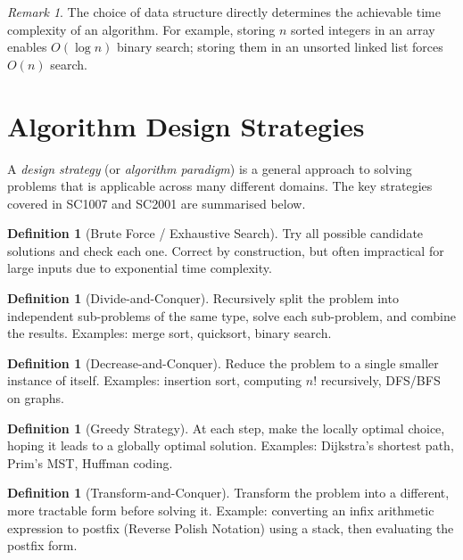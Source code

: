 \documentclass[11pt, a4paper, notitlepage]{report}
\theoremstyle{definition}
\newtheorem{definition}[theorem]{Definition}
\theoremstyle{remark}
\newtheorem{remark}[theorem]{Remark}
\theoremstyle{definition}
\begin{document}
\begin{remark}
The choice of data structure directly determines the achievable time complexity of an
algorithm.  For example, storing $n$ sorted integers in an array enables $O(\log n)$ binary
search; storing them in an unsorted linked list forces $O(n)$ search.
\end{remark}

\section{Algorithm Design Strategies}
\label{sec:design-strategies}

A \emph{design strategy} (or \emph{algorithm paradigm}) is a general approach to solving
problems that is applicable across many different domains.  The key strategies covered in
SC1007 and SC2001 are summarised below.

\begin{definition}[Brute Force / Exhaustive Search]
Try all possible candidate solutions and check each one.  Correct by construction, but often
impractical for large inputs due to exponential time complexity.
\end{definition}

\begin{definition}[Divide-and-Conquer]
Recursively split the problem into independent sub-problems of the same type, solve each
sub-problem, and combine the results.  Examples: merge sort, quicksort, binary search.
\end{definition}

\begin{definition}[Decrease-and-Conquer]
Reduce the problem to a single smaller instance of itself.  Examples: insertion sort,
computing $n!$ recursively, DFS/BFS on graphs.
\end{definition}

\begin{definition}[Greedy Strategy]
At each step, make the locally optimal choice, hoping it leads to a globally optimal solution.
Examples: Dijkstra's shortest path, Prim's MST, Huffman coding.
\end{definition}

\begin{definition}[Transform-and-Conquer]
Transform the problem into a different, more tractable form before solving it.  Example:
converting an infix arithmetic expression to postfix (Reverse Polish Notation) using a stack,
then evaluating the postfix form.
\end{definition}
\end{document}
